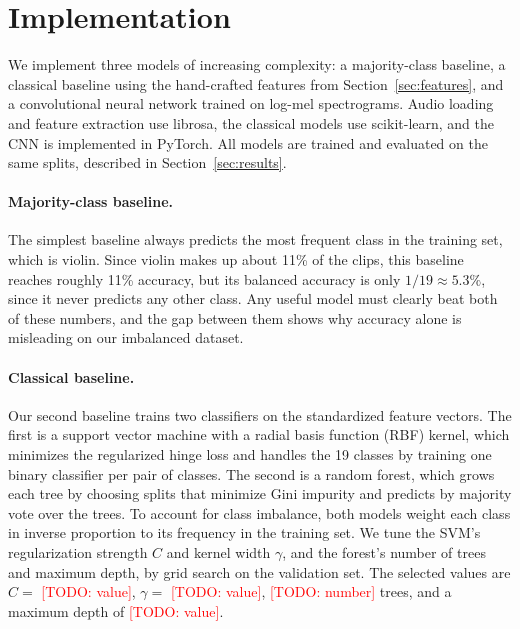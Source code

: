 \documentclass[11pt]{article}
\newcommand{\todo}[1]{\textcolor{red}{[TODO: #1]}}
\begin{document}
\section{Implementation}

We implement three models of increasing complexity: a majority-class baseline, a classical baseline using the hand-crafted features from Section~\ref{sec:features}, and a convolutional neural network trained on log-mel spectrograms. Audio loading and feature extraction use librosa, the classical models use scikit-learn, and the CNN is implemented in PyTorch. All models are trained and evaluated on the same splits, described in Section~\ref{sec:results}.

\paragraph{Majority-class baseline.} The simplest baseline always predicts the most frequent class in the training set, which is violin. Since violin makes up about 11\% of the clips, this baseline reaches roughly 11\% accuracy, but its balanced accuracy is only $1/19 \approx 5.3\%$, since it never predicts any other class. Any useful model must clearly beat both of these numbers, and the gap between them shows why accuracy alone is misleading on our imbalanced dataset.

\paragraph{Classical baseline.} Our second baseline trains two classifiers on the standardized feature vectors. The first is a support vector machine with a radial basis function (RBF) kernel, which minimizes the regularized hinge loss and handles the 19 classes by training one binary classifier per pair of classes. The second is a random forest, which grows each tree by choosing splits that minimize Gini impurity and predicts by majority vote over the trees. To account for class imbalance, both models weight each class in inverse proportion to its frequency in the training set. We tune the SVM's regularization strength $C$ and kernel width $\gamma$, and the forest's number of trees and maximum depth, by grid search on the validation set. The selected values are $C = $ \todo{value}, $\gamma = $ \todo{value}, \todo{number} trees, and a maximum depth of \todo{value}.
\end{document}
